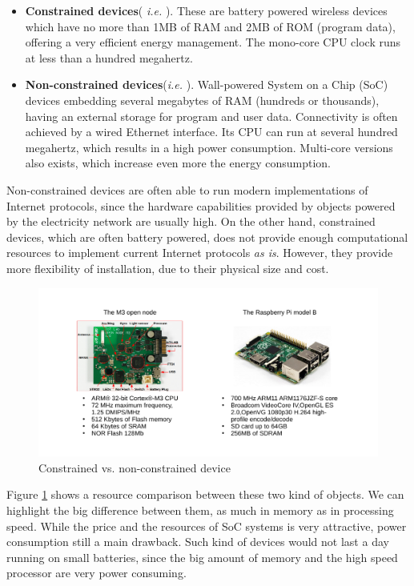 \begin{itemize}
	\item \textbf{Constrained devices}(\textit{ i.e.} \cite{iotlab-m3}). These are battery powered wireless devices which have no more than 1MB of RAM and 2MB of ROM (program data), offering a very efficient energy management. The mono-core CPU clock runs at less than a hundred megahertz.
	\item \textbf{Non-constrained devices}(\textit{i.e.}  \cite{RPi}). Wall-powered System on a Chip (SoC) devices embedding several megabytes of RAM (hundreds or thousands), having an external storage for program and user data. Connectivity is often achieved by a wired Ethernet interface. Its CPU can run at several hundred megahertz, which results in a high power consumption. Multi-core versions also exists, which increase even more the energy consumption.
\end{itemize}

Non-constrained devices are often able to run modern implementations of Internet protocols, since the hardware capabilities provided by objects powered by the electricity network are usually high.
On the other hand, constrained devices, which are often battery powered, does not provide enough computational resources to implement current Internet protocols \textit{as is}.
However, they provide more flexibility of installation, due to their physical size and cost.

\begin{figure}[htb]
	\centering
	\includegraphics[width=1\columnwidth]{chapters/background.images/BoardsComparison.pdf}
	\caption{Constrained vs. non-constrained device}
	\label{fig:BoardsComparison}
\end{figure}

Figure \ref{fig:BoardsComparison} shows a resource comparison between these two kind of objects.
We can highlight the big difference between them, as much in memory as in processing speed.
While the price and the resources of SoC systems is very attractive, power consumption still a main drawback.
Such kind of devices would not last a day running on small batteries, since the big amount of memory and the high speed processor are very power consuming.

